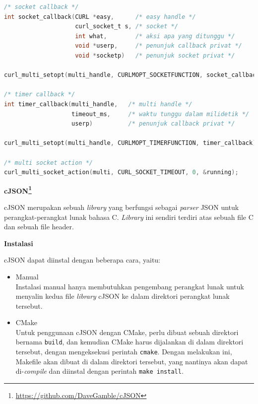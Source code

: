 \documentclass[a4paper,twoside]{article}
\begin{document}
\begin{enumerate}
\vspace{0.5\baselineskip}
\begin{lstlisting}[language=C, caption=Kumpulan implementasi pengunaan \textit{multi socket handle} curl, label=code:curl-usage-multisocket]
/* socket callback */
int socket_callback(CURL *easy,      /* easy handle */
                    curl_socket_t s, /* socket */
                    int what,        /* aksi apa yang ditunggu */
                    void *userp,     /* penunjuk callback privat */
                    void *socketp)   /* penunjuk socket privat */

curl_multi_setopt(multi_handle, CURLMOPT_SOCKETFUNCTION, socket_callback);

/* timer callback */
int timer_callback(multi_handle,   /* multi handle */
                   timeout_ms,     /* waktu tunggu dalam milidetik */
                   userp)          /* penunjuk callback privat */

curl_multi_setopt(multi_handle, CURLMOPT_TIMERFUNCTION, timer_callback);

/* multi socket action */
curl_multi_socket_action(multi, CURL_SOCKET_TIMEOUT, 0, &running);
\end{lstlisting}

\textbf{\large{cJSON}\footnote{\href{https://github.com/DaveGamble/cJSON}{https://github.com/DaveGamble/cJSON}}}
\label{sec:cmodules-cJSON}

cJSON merupakan sebuah \textit{library} yang berfungsi sebagai \textit{parser} JSON untuk perangkat-perangkat lunak bahasa C. \textit{Library} ini sendiri terdiri atas sebuah file C dan sebuah file header.

\textbf{Instalasi}
\label{sec:cmodules-cJSON-instalation}

cJSON dapat diinstal dengan beberapa cara, yaitu:

\begin{itemize}
	\item Manual\\
	Instalasi manual hanya membutuhkan pengembang perangkat lunak untuk menyalin kedua file \textit{library} cJSON ke dalam direktori perangkat lunak tersebut.
	\item CMake\\
	Untuk penggunaan cJSON dengan CMake, perlu dibuat sebuah direktori bernama \verb|build|, dan kemudian CMake harus dijalankan di dalam direktori tersebut, dengan mengeksekusi perintah \verb|cmake|. Dengan melakukan ini, Makefile akan dibuat di dalam direktori tersebut, yang nantinya akan dapat di-\textit{compile} dan diinstal dengan perintah \verb|make install|.
	

\end{itemize}
\end{enumerate}
\end{document}
